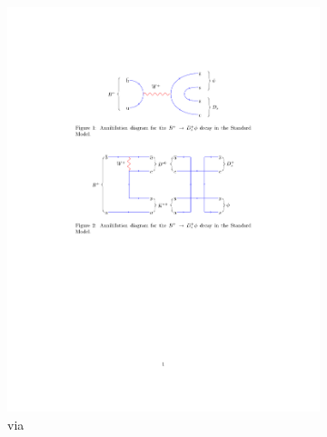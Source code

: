 \begin{figure}[!h]
    \centering
    \begin{subfigure}[m]{0.7\textwidth}
        \centering
        \includegraphics[width=1.0\textwidth]{figs/Theory/B2DsPhi_Rescattering_B2D0K.pdf}
        \caption{via \decay{\Bp}{\Dstarz\Kstarp}}
    \end{subfigure}
    \begin{subfigure}[m]{0.7\textwidth}
        \centering

\end{subfigure}
\end{figure}
